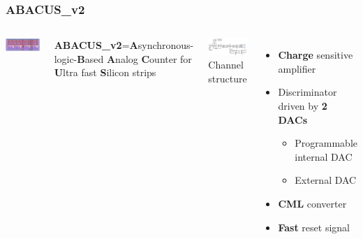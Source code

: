 \documentclass[aspectratio=169]{beamer}
\begin{document}
	\begin{frame}
	\frametitle{ABACUS\_v2}
	\begin{columns}
		\begin{center}
				\includegraphics[width=1.85 \textwidth, angle=90]{IMG/ABACUS2.png}
		\end{center}
		\begin{center}
			{\color{blue} \textbf{ABACUS\_v2}}={\tiny \textbf{A}synchronous-logic-\textbf{B}ased \textbf{A}nalog \textbf{C}ounter for \textbf{U}ltra fast \textbf{S}ilicon strips}
		\end{center}
		\begin{columns}
			\includegraphics[width=0.99 \textwidth]{IMG/ABACUS_channel.PNG}
			{\color{blue} Channel structure }
			{\small 
			\begin{itemize}
				\item \textbf{Charge} sensitive amplifier
				\item Discriminator driven by \textbf{2 DACs}
				\begin{itemize}
					\item Programmable internal DAC
					\item External DAC 
				\end{itemize}
				\item \textbf{CML} converter 
				\item \textbf{Fast} reset signal
			\end{itemize} }

\end{columns}
\end{columns}
\end{frame}
\end{document}
